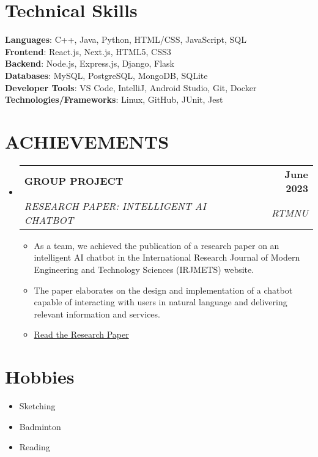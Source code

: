 \documentclass[letterpaper,11pt]{article}
\makeatletter
\newcommand{\resumeItem}[1]{
  \item\small{
    {#1 \vspace{-2pt}}
  }
}
\newcommand{\resumeSubheading}[4]{
  \vspace{-2pt}\item
    \begin{tabular*}{1.0\textwidth}[t]{l@{\extracolsep{\fill}}r}
      \textbf{#1} & \textbf{\small #2} \\
      \textit{\small#3} & \textit{\small #4} \\
    \end{tabular*}\vspace{-7pt}
}
\newcommand{\resumeSubHeadingListStart}{\begin{itemize}[leftmargin=0.0in, label={}]}
\newcommand{\resumeSubHeadingListEnd}{\end{itemize}}
\newcommand{\resumeItemListStart}{\begin{itemize}}
\newcommand{\resumeItemListEnd}{\end{itemize}\vspace{-5pt}}
\makeatother
\begin{document}
\section{Technical Skills}
 \begin{itemize}[leftmargin=0.15in, label={}]
    \small{\item{
     \textbf{Languages}{: C++, Java, Python, HTML/CSS, JavaScript, SQL} \\
     \textbf{Frontend}{: React.js, Next.js, HTML5, CSS3} \\
     \textbf{Backend}{: Node.js, Express.js, Django, Flask} \\
     \textbf{Databases}{: MySQL, PostgreSQL, MongoDB, SQLite} \\
     \textbf{Developer Tools}{: VS Code, IntelliJ, Android Studio, Git, Docker} \\
     \textbf{Technologies/Frameworks}{: Linux, GitHub, JUnit, Jest} \\
    }}
 \end{itemize}
 \vspace{-16pt}

\section{ACHIEVEMENTS}
    \resumeSubHeadingListStart
    \resumeSubheading{GROUP PROJECT}{June 2023}{RESEARCH PAPER: INTELLIGENT AI CHATBOT}{RTMNU}
        \resumeItemListStart
            \resumeItem{As a team, we achieved the publication of a research paper on an intelligent AI chatbot in the International Research Journal of Modern Engineering and Technology Sciences (IRJMETS) website.}
            \resumeItem{The paper elaborates on the design and implementation of a chatbot capable of interacting with users in natural language and delivering relevant information and services.}
            \resumeItem{\href{https://www.irjmets.com/uploadedfiles/paper/issue_6_june_2023/41275/final/fin_irjmets1685775338.pdf}{Read the Research Paper}} %
        \resumeItemListEnd
    \resumeSubHeadingListEnd

\section{Hobbies}
  \resumeItemListStart
    \resumeItem{Sketching}
    \resumeItem{Badminton}
    \resumeItem{Reading}
  \resumeItemListEnd
\end{document}

